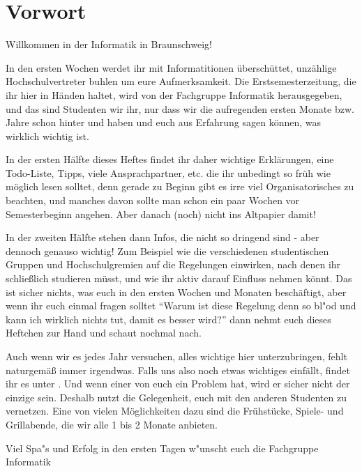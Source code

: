\section*{Vorwort}

\renewcommand{\baselinestretch}{0.75}\normalsize
Willkommen in der Informatik in Braunschweig!

In den ersten Wochen werdet ihr mit Informatitionen überschüttet, 
unzählige Hochschulvertreter buhlen um eure Aufmerksamkeit. Die 
Erstsemesterzeitung, die ihr hier in Händen haltet, wird von der 
Fachgruppe Informatik herausgegeben, und das sind Studenten wir 
ihr, nur dass wir die aufregenden ersten Monate bzw. Jahre schon 
hinter und haben und euch aus Erfahrung sagen können, was 
wirklich wichtig ist.

In der ersten Hälfte dieses Heftes findet ihr daher wichtige 
Erklärungen, eine Todo-Liste, Tipps, viele Ansprachpartner, 
etc. die ihr unbedingt so früh wie möglich lesen solltet, denn 
gerade zu Beginn gibt es irre viel Organisatorisches zu beachten, 
und manches davon sollte man schon ein paar Wochen vor 
Semesterbeginn angehen. Aber danach (noch) nicht ins Altpapier damit!

In der zweiten Hälfte stehen dann Infos, die nicht so dringend
sind - aber dennoch genauso wichtig! Zum Beispiel wie die 
verschiedenen studentischen Gruppen und Hochschulgremien auf 
die Regelungen einwirken, nach denen ihr schließlich studieren 
müsst, und wie ihr aktiv darauf Einfluss nehmen könnt. Das ist sicher 
nichts, was euch in den ersten Wochen und Monaten beschäftigt, aber 
wenn ihr euch einmal fragen solltet "`Warum ist diese Regelung denn 
so bl"od und kann ich wirklich nichts tut, damit es besser wird?"' 
dann nehmt euch dieses Heftchen zur Hand und schaut nochmal nach.

Auch wenn wir es jedes Jahr versuchen, alles wichtige hier 
unterzubringen, fehlt naturgemäß immer irgendwas. Falls uns also 
noch etwas wichtiges einfällt, findet ihr es unter 
\mbox{}. Und wenn einer von euch 
ein Problem hat, wird er sicher nicht der einzige sein. Deshalb 
nutzt die Gelegenheit, euch mit den anderen Studenten zu vernetzen. 
Eine von vielen Möglichkeiten dazu sind die Frühstücke, Spiele- und 
Grillabende, die wir alle 1 bis 2 Monate anbieten.

Viel Spa"s und Erfolg in den ersten Tagen w"unscht euch die 
Fachgruppe Informatik

\renewcommand{\baselinestretch}{1}\normalsize